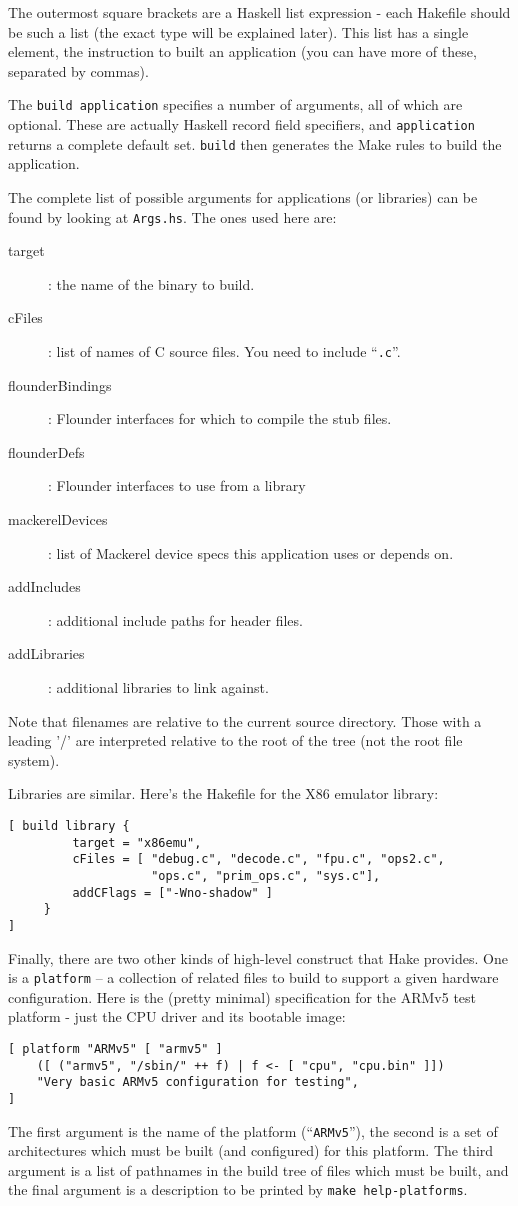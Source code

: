 \documentclass[a4paper,twoside]{report} %
\begin{document}
The outermost square brackets are a Haskell list expression - each
Hakefile should be such a list (the exact type will be explained
later).   This list has a single element, the instruction to built an
application (you can have more of these, separated by commas). 

The \texttt{build application} specifies a number of arguments, all of
which are optional.  These are actually Haskell record field
specifiers, and \texttt{application} returns a complete default set.
\texttt{build} then generates the Make rules to build the
application. 

The complete list of possible arguments for applications (or
libraries) can be found by looking at \texttt{Args.hs}.  The ones used
here are:
\begin{description}
\item[target]: the name of the binary to build.  
\item[cFiles]: list of names of C source files. You need to include
  ``\texttt{.c}''. 
\item[flounderBindings]: Flounder interfaces for which to compile 
  the stub files.  
\item[flounderDefs]: Flounder interfaces to use from a library
\item[mackerelDevices]: list of Mackerel device specs this application uses or depends on. 
\item[addIncludes]: additional include paths for header files. 
\item[addLibraries]: additional libraries to link against.
\end{description}

Note that filenames are relative to the current source
directory. Those with a leading '/' are interpreted relative to the
root of the tree (not the root file system).   

Libraries are similar.  Here's the Hakefile for the X86 emulator
library:
\begin{verbatim}
[ build library { 
         target = "x86emu",
         cFiles = [ "debug.c", "decode.c", "fpu.c", "ops2.c",
                    "ops.c", "prim_ops.c", "sys.c"],
         addCFlags = ["-Wno-shadow" ]
     }
]
\end{verbatim}

Finally, there are two other kinds of high-level construct that Hake
provides.  One is a \texttt{platform} -- a collection of related files
to build to support a given hardware configuration.  Here is the
(pretty minimal) specification for the ARMv5 test platform - just the
CPU driver and its bootable image:
\begin{verbatim}
[ platform "ARMv5" [ "armv5" ]
    ([ ("armv5", "/sbin/" ++ f) | f <- [ "cpu", "cpu.bin" ]])
    "Very basic ARMv5 configuration for testing",
]
\end{verbatim}
The first argument is the name of the platform (``\texttt{ARMv5}''),
the second is a set of architectures which must be built (and
configured) for this platform.  The third argument is a list of
pathnames in the build tree of files which must be built, and the
final argument is a description to be printed by \texttt{make
  help-platforms}. 
\end{document}
